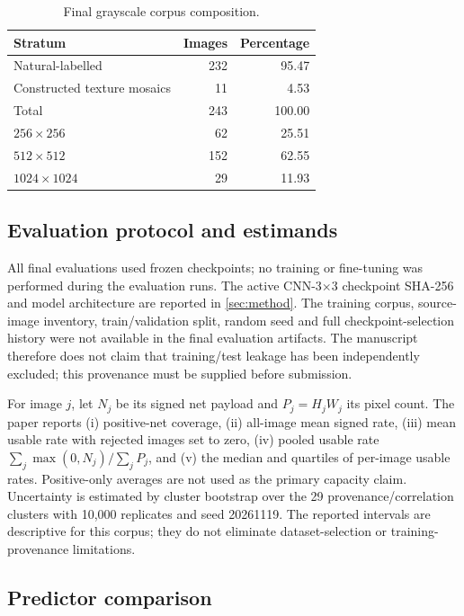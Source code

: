\documentclass[preprint,12pt,a4paper]{elsarticle}
\begin{document}
\begin{table}[t]
\centering
\caption{Final grayscale corpus composition.}
\label{tab:corpus}
\small
\begin{tabular}{lrr}
\toprule
Stratum & Images & Percentage\\
\midrule
Natural-labelled & 232 & 95.47\\
Constructed texture mosaics & 11 & 4.53\\
\midrule
Total & 243 & 100.00\\
\addlinespace
$256\times256$ & 62 & 25.51\\
$512\times512$ & 152 & 62.55\\
$1024\times1024$ & 29 & 11.93\\
\bottomrule
\end{tabular}
\end{table}

\subsection{Evaluation protocol and estimands}

All final evaluations used frozen checkpoints; no training or fine-tuning was performed during the evaluation runs. The active CNN-3$\times$3 checkpoint SHA-256 and model architecture are reported in \cref{sec:method}. The training corpus, source-image inventory, train/validation split, random seed and full checkpoint-selection history were not available in the final evaluation artifacts. The manuscript therefore does not claim that training/test leakage has been independently excluded; this provenance must be supplied before submission.

For image $j$, let $N_j$ be its signed net payload and $P_j=H_jW_j$ its pixel count. The paper reports (i) positive-net coverage, (ii) all-image mean signed rate, (iii) mean usable rate with rejected images set to zero, (iv) pooled usable rate $\sum_j\max(0,N_j)/\sum_jP_j$, and (v) the median and quartiles of per-image usable rates. Positive-only averages are not used as the primary capacity claim. Uncertainty is estimated by cluster bootstrap over the 29 provenance/correlation clusters with 10,000 replicates and seed 20261119. The reported intervals are descriptive for this corpus; they do not eliminate dataset-selection or training-provenance limitations.

\subsection{Predictor comparison}
\end{document}
